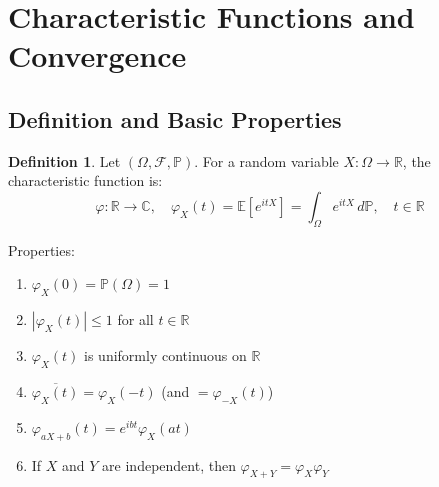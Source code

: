 \documentclass[11pt,a4paper]{article}
\theoremstyle{definition}
\newtheorem{definition}{Definition}[section]
\begin{document}
\newpage

\section{Characteristic Functions and Convergence}

\subsection{Definition and Basic Properties}

\begin{definition}
Let $(\Omega, \mathcal{F}, \mathbb{P})$. For a random variable $X: \Omega \to \mathbb{R}$, the characteristic function is:
\[ \varphi: \mathbb{R} \to \mathbb{C}, \quad \varphi_X(t) = \mathbb{E}[e^{itX}] = \int_\Omega e^{itX} \, d \mathbb{P}, \quad t\in \mathbb{R} \]
\end{definition}
\noindent Properties:
\begin{enumerate}
\item $\varphi_X(0) = \mathbb{P} (\Omega) = 1$
\item $|\varphi_X(t)| \leq 1$ for all $t \in \mathbb{R}$
\item $\varphi_X(t)$ is uniformly continuous on $\mathbb{R}$
\item $\overline{\varphi_X(t)} = \varphi_X(-t)$ (and $= \varphi_{-X}(t)$)
\item $\varphi_{aX+b}(t) = e^{ibt} \varphi_X(at)$
\item If $X$ and $Y$ are independent, then $\varphi _{X+Y} = \varphi_X \varphi_Y$
\end{enumerate}
\end{document}
